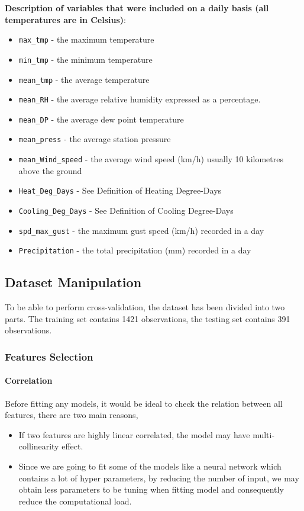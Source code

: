 \documentclass[a4paper,11pt]{article}
\begin{document}
\textbf{Description of variables that were included on a daily basis (all temperatures are in Celsius)}:
\begin{itemize}
  \item \verb|max_tmp| - the maximum temperature 
  \item \verb|min_tmp| - the minimum temperature 
  \item \verb|mean_tmp| - the average temperature 
  \item \verb|mean_RH| - the average relative humidity expressed as a percentage.
  \item \verb|mean_DP| - the average dew point temperature
  \item \verb|mean_press| - the average station pressure
  \item \verb|mean_Wind_speed| - the average wind speed (km/h) usually 10 kilometres above the ground
  \item \verb|Heat_Deg_Days| - See Definition of Heating Degree-Days
  \item \verb|Cooling_Deg_Days| - See Definition of Cooling Degree-Days
  \item \verb|spd_max_gust| - the maximum gust speed (km/h) recorded in a day
  \item \verb|Precipitation| - the total precipitation (mm) recorded in a day
\end{itemize} 

\subsection{Dataset Manipulation}

To be able to perform cross-validation, the dataset has been divided into two parts. The training set contains 1421 observations, the testing set contains 391 observations.\par

\subsubsection{Features Selection}

\paragraph{Correlation} Before fitting any models, it would be ideal to check the relation between all features, there are two main reasons, 
\begin{itemize}
	\item If two features are highly linear correlated, the model may have multi-collinearity effect.
	\item Since we are going to fit some of the models like a neural network which contains a lot of hyper parameters, by reducing the number of input, we may obtain less parameters to be tuning when fitting model and consequently reduce the computational load.
\end{itemize}
\end{document}
